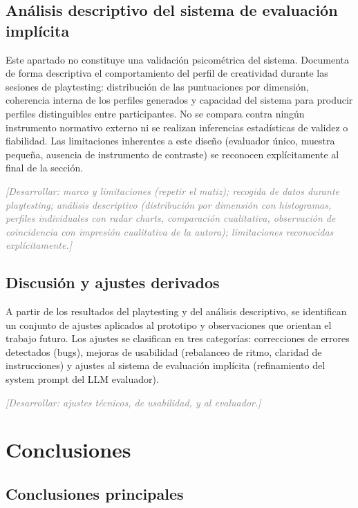 \documentclass[12pt,twoside,titlepage]{report}
\begin{document}
\section{Análisis descriptivo del sistema de evaluación implícita}

Este apartado no constituye una validación psicométrica del sistema. Documenta de forma descriptiva el comportamiento del perfil de creatividad durante las sesiones de playtesting: distribución de las puntuaciones por dimensión, coherencia interna de los perfiles generados y capacidad del sistema para producir perfiles distinguibles entre participantes. No se compara contra ningún instrumento normativo externo ni se realizan inferencias estadísticas de validez o fiabilidad. Las limitaciones inherentes a este diseño (evaluador único, muestra pequeña, ausencia de instrumento de contraste) se reconocen explícitamente al final de la sección.

\textcolor{gray}{\textit{[Desarrollar: marco y limitaciones (repetir el matiz); recogida de datos durante playtesting; análisis descriptivo (distribución por dimensión con histogramas, perfiles individuales con radar charts, comparación cualitativa, observación de coincidencia con impresión cualitativa de la autora); limitaciones reconocidas explícitamente.]}}

\section{Discusión y ajustes derivados}

A partir de los resultados del playtesting y del análisis descriptivo, se identifican un conjunto de ajustes aplicados al prototipo y observaciones que orientan el trabajo futuro. Los ajustes se clasifican en tres categorías: correcciones de errores detectados (bugs), mejoras de usabilidad (rebalanceo de ritmo, claridad de instrucciones) y ajustes al sistema de evaluación implícita (refinamiento del system prompt del LLM evaluador).

\textcolor{gray}{\textit{[Desarrollar: ajustes técnicos, de usabilidad, y al evaluador.]}}

\chapter{Conclusiones}

\section{Conclusiones principales}
\end{document}
